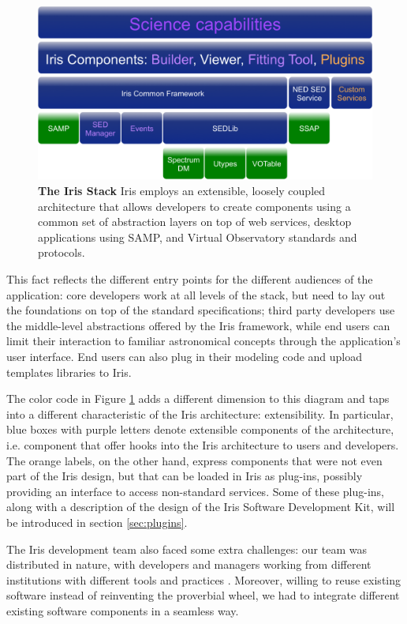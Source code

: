 \documentclass[5p]{elsarticle}
\begin{document}
\begin{figure}
\label{fig:stack}
\begin{center}
\includegraphics[width=\columnwidth]{figures/IrisStack.png}
\caption{\textbf{The Iris Stack} Iris employs an extensible, loosely coupled architecture that allows developers to create components using a common set of abstraction layers on top of web services, desktop applications using SAMP, and Virtual Observatory standards and protocols.}
\end{center}
\end{figure}

This fact reflects the different entry points for the different audiences of the application: core developers work at all levels of the stack, but need to lay out the foundations on top of the standard specifications; third party developers use the middle-level abstractions offered by the Iris framework, while end users can limit their interaction to familiar astronomical concepts through the application's user interface. End users can also plug in their modeling code and upload templates libraries to Iris.

The color code in Figure \ref{fig:stack} adds a different dimension to this diagram and taps into a different characteristic of the Iris architecture: extensibility. In particular, blue boxes with purple letters denote extensible components of the architecture, i.e. component that offer hooks into the Iris architecture to users and developers. The orange labels, on the other hand, express components that were not even part of the Iris design, but that can be loaded in Iris as plug-ins, possibly providing an interface to access non-standard services. Some of these plug-ins, along with a description of the design of the Iris Software Development Kit, will be introduced in section \ref{sec:plugins}.

The Iris development team also faced some extra challenges: our team was distributed in nature, with developers and managers working from different institutions with different tools and practices \citep{2012SPIE.8449E..0IE}. Moreover, willing to reuse existing software instead of reinventing the proverbial wheel, we had to integrate different existing software components in a seamless way.
\end{document}
